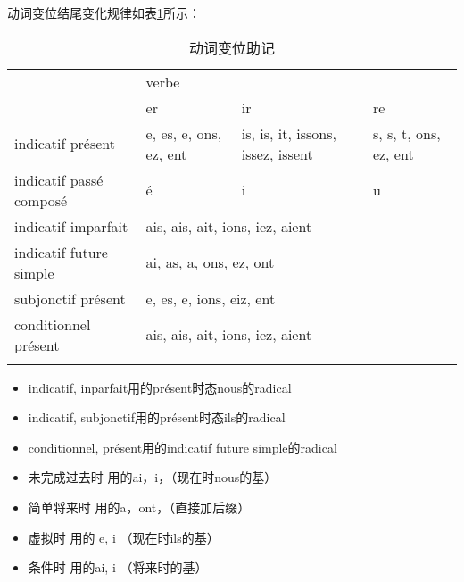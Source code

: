 动词变位结尾变化规律如表\ref{tab:congugaison-remember}所示：
\begin{table}[!ht]
  \centering
  \begin{tabular}{p{}|p{}|p{}|p{}}
    \hline{}
    & \multicolumn{3}{l}{verbe} \\
    \cline{2-4}
    & er & ir & re \\
    \hline
    indicatif présent & e, es, e, ons, ez, ent & is, is, it, issons,
                                                 issez, issent & s, s,
                                                                 t,
                                                                 ons,
                                                                 ez,
                                                                 ent
    \\
    \hline{}
    indicatif passé composé & é & i & u \\
    \hline{}
    indicatif imparfait & \multicolumn{3}{l}{ais, ais, ait, ions, iez,
                          aient} \\
    \hline{}
    indicatif future simple & \multicolumn{3}{l}{ai, as, a, ons, ez,
                              ont} \\
    \hline{}
    subjonctif présent & \multicolumn{3}{l}{e, es, e, ions, eiz, ent}
    \\
    \hline{}
    conditionnel présent & \multicolumn{3}{l}{ais, ais, ait, ions,
                           iez, aient} \\
    \hline{}
  \end{tabular}
  \caption{动词变位助记}
  \label{tab:congugaison-remember}
\end{table}


\begin{itemize}
\item indicatif, inparfait用的présent时态nous的radical
\item indicatif, subjonctif用的présent时态ils的radical
\item conditionnel, présent用的indicatif future simple的radical
\end{itemize}


\begin{itemize}
\item 未完成过去时 用的ai，i，（现在时nous的基）
\item 简单将来时 用的a，ont，（直接加后缀）
\item 虚拟时 用的 e, i （现在时ils的基）
\item 条件时 用的ai, i （将来时的基）
\end{itemize}




